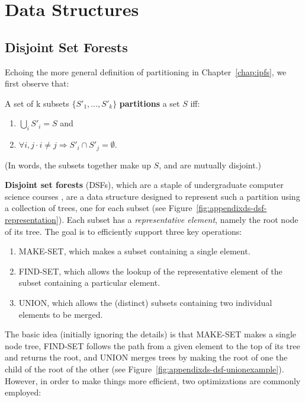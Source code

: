 \chapter{Data Structures}
\label{chap:appendixds}

\section{Disjoint Set Forests}

Echoing the more general definition of partitioning in Chapter~\ref{chap:ipfs}, we first observe that:

\begin{definition}
A set of k subsets $\{S'_1,\ldots,S'_k\}$ \textbf{partitions} a set $S$ iff:

\begin{enumerate}
\item $\bigcup_i S'_i = S$ and
\item $\forall i,j \cdot i \ne j \Rightarrow S'_i \cap S'_j = \emptyset$.
\end{enumerate}

\noindent (In words, the subsets together make up $S$, and are mutually disjoint.)
\end{definition}

\noindent \textbf{Disjoint set forests} (DSFs), which are a staple of undergraduate computer science courses \cite{worrell06}, are a data structure designed to represent such a partition using a collection of trees, one for each subset (see Figure~\ref{fig:appendixds-dsf-representation}). Each subset has a \emph{representative element}, namely the root node of its tree. The goal is to efficiently support three key operations:


\begin{enumerate}

\item MAKE-SET, which makes a subset containing a single element.
\item FIND-SET, which allows the lookup of the representative element of the subset containing a particular element.
\item UNION, which allows the (distinct) subsets containing two individual elements to be merged.

\end{enumerate}
%
The basic idea (initially ignoring the details) is that MAKE-SET makes a single node tree, FIND-SET follows the path from a given element to the top of its tree and returns the root, and UNION merges trees by making the root of one the child of the root of the other (see Figure~\ref{fig:appendixds-dsf-unionexample}). However, in order to make things more efficient, two optimizations are commonly employed:

